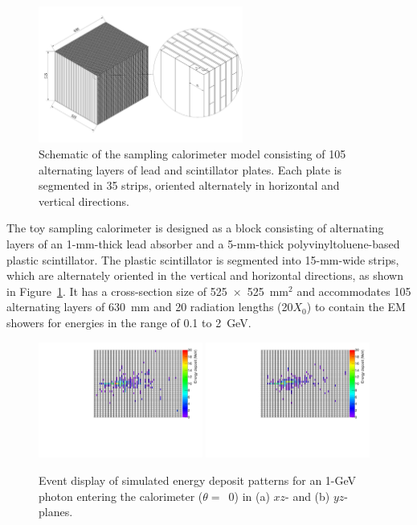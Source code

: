 \documentclass[12pt,times,draftclsnofoot,a4paper]{elsarticle}
\begin{document}
\begin{figure}[!hbt]
\centering
\includegraphics[width=0.6\textwidth]{Fig1_detector_schematic.jpeg}
\caption{ Schematic of the sampling calorimeter model consisting of 105 alternating layers of lead and scintillator plates. Each plate is segmented in 35 strips, oriented alternately in horizontal and vertical directions. }
\label{fig:det_conf}
\end{figure}

The toy sampling calorimeter is designed as a block consisting of alternating layers of an 1-mm-thick lead absorber and a 5-mm-thick polyvinyltoluene-based plastic scintillator. The plastic scintillator is segmented into 15-mm-wide strips, which are alternately oriented in the vertical and horizontal directions, as shown in Figure~\ref{fig:det_conf}. It has a cross-section size of 525~$\times$~525~mm$^{2}$ and accommodates 105 alternating layers of 630~mm and 20 radiation lengths (20$X_{0}$) to contain the EM showers for energies in the range of 0.1 to 2~GeV.

\begin{figure}[!hbt]
\centering
\includegraphics[width=0.48\textwidth]{Fig2_EMShower_XZ.pdf}
\includegraphics[width=0.48\textwidth]{Fig2_EMShower_YZ.pdf}
\caption{ Event display of simulated energy deposit patterns for an 1-GeV photon entering the calorimeter ($\theta=$~0) in (a) $xz$- and (b) $yz$-planes.}
\label{fig:Evt_Dis}
\end{figure}
\end{document}
